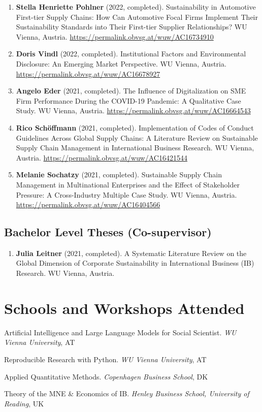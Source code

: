 \documentclass[11pt,a4paper]{article}
\begin{document}
\begin{cv}
\begin{enumerate}
    \item \textbf{Stella Henriette Pohlner} (2022, completed). Sustainability in Automotive First-tier Supply Chains: How Can Automotive Focal Firms Implement Their Sustainability Standards into Their First-tier Supplier Relationships? WU Vienna, Austria. \url{https://permalink.obvsg.at/wuw/AC16734910}
    
    \item \textbf{Doris Vindl} (2022, completed). Institutional Factors and Environmental Disclosure: An Emerging Market Perspective. WU Vienna, Austria. \url{https://permalink.obvsg.at/wuw/AC16678927}
    
    \item \textbf{Angelo Eder} (2021, completed). The Influence of Digitalization on SME Firm Performance During the COVID-19 Pandemic: A Qualitative Case Study. WU Vienna, Austria. \url{https://permalink.obvsg.at/wuw/AC16664543}
    
    \item \textbf{Rico Schöffmann} (2021, completed). Implementation of Codes of Conduct Guidelines Across Global Supply Chains: A Literature Review on Sustainable Supply Chain Management in International Business Research. WU Vienna, Austria. \url{https://permalink.obvsg.at/wuw/AC16421544}
    
    \item \textbf{Melanie Sochatzy} (2021, completed). Sustainable Supply Chain Management in Multinational Enterprises and the Effect of Stakeholder Pressure: A Cross-Industry Multiple Case Study. WU Vienna, Austria. \url{https://permalink.obvsg.at/wuw/AC16404566}
\end{enumerate}

\subsection{Bachelor Level Theses (Co-supervisor)}

\begin{enumerate}
    \item \textbf{Julia Leitner} (2021, completed). A Systematic Literature Review on the Global Dimension of Corporate Sustainability in International Business (IB) Research. WU Vienna, Austria.
\end{enumerate}


\section{Schools and Workshops Attended}
\begin{cvlist}{}
    \item[{Feb 2026}] Artificial Intelligence and Large Language Models for Social Scientist. \textit{WU Vienna University}, AT
    \item[{Jan 2026}] Reproducible Research with Python. \textit{WU Vienna University}, AT
    \item[{Mar 2022}] Applied Quantitative Methods. \textit{Copenhagen Business School}, DK
    \item[{Nov 2020}] Theory of the MNE \& Economics of IB. \textit{Henley Business School, University of Reading}, UK
\end{cvlist}


\end{cv}
\end{document}
